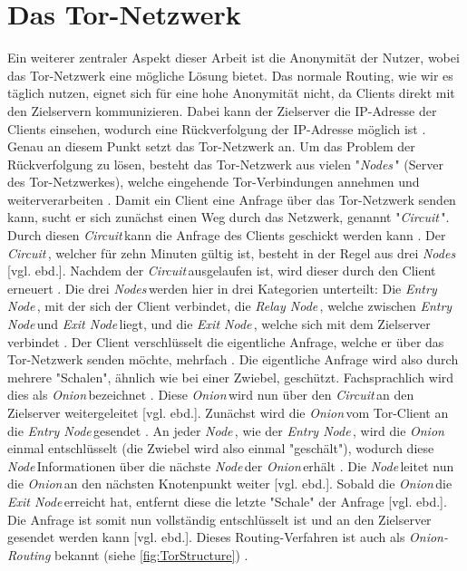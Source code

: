 \documentclass[a4paper,ngerman, headheight=28pt,12pt, footheight=27pt]{scrartcl}
\newcommand{\vcite}[1]{\cite[vgl.][]{#1}}
\newcommand{\vebd}{[vgl. ebd.]}
\newcommand{\entryn}{\textit{Entry Node\,}}
\newcommand{\relayn}{\textit{Relay Node\,}}
\newcommand{\exitn}{\textit{Exit Node\,}}
\newcommand{\nodes}{\textit{Nodes\,}}
\newcommand{\node}{\textit{Node\,}}
\newcommand{\onion}{\textit{Onion\,}}
\newcommand{\circuit}{\textit{Circuit\,}}
\begin{document}
\section{Das Tor-Netzwerk}
Ein weiterer zentraler Aspekt dieser Arbeit ist die Anonymität der Nutzer, wobei das Tor-Netzwerk eine mögliche Lösung bietet. Das normale Routing, wie wir es täglich nutzen, eignet sich für eine hohe Anonymität nicht, da Clients direkt mit den Zielservern kommunizieren. Dabei kann der Zielserver die IP-Adresse der Clients einsehen, wodurch eine Rückverfolgung der IP-Adresse möglich ist \vcite{TCP_IP,LocPolice}.
Genau an diesem Punkt setzt das Tor-Netzwerk an.
Um das Problem der Rückverfolgung zu lösen, besteht das Tor-Netzwerk aus vielen "\nodes" (Server des Tor-Netzwerkes), welche eingehende Tor-Verbindungen annehmen und weiterverarbeiten  \vcite{TorStructure}.
Damit ein Client eine Anfrage über das Tor-Netzwerk senden kann, sucht er sich zunächst einen Weg durch das Netzwerk, genannt "\circuit". Durch diesen \circuit kann die Anfrage des Clients geschickt werden kann \vcite{TorCircuits}.
Der \circuit, welcher für zehn Minuten gültig ist, besteht in der Regel aus drei \nodes \vebd. Nachdem der \circuit ausgelaufen ist, wird dieser durch den Client erneuert \vcite{FAQCircuitLifetime}.
Die drei \nodes werden hier in drei Kategorien unterteilt: Die \entryn, mit der sich der Client verbindet, die \relayn, welche zwischen \entryn und \exitn liegt, und die \exitn, welche sich mit dem Zielserver verbindet \vcite{TorStructure}. Der Client verschlüsselt die eigentliche Anfrage, welche er über das Tor-Netzwerk senden möchte, mehrfach \vcite{TorFirstPub}. Die eigentliche Anfrage wird also durch mehrere "Schalen", ähnlich wie bei einer Zwiebel, geschützt. Fachsprachlich wird dies als \onion bezeichnet \vcite{TorFirstPub}. Diese \onion wird nun über den \circuit an den Zielserver weitergeleitet \vebd.
Zunächst wird die \onion vom Tor-Client an die \entryn gesendet \vcite{TorStructure}. An jeder \node, wie der \entryn, wird die \onion einmal entschlüsselt (die Zwiebel wird also einmal "geschält"), wodurch diese \node Informationen über die nächste \node der \onion erhält \vcite{TorFirstPub}. Die \node leitet nun die \onion an den nächsten Knotenpunkt weiter \vebd. Sobald die \onion die \exitn erreicht hat, entfernt diese die letzte "Schale" der Anfrage \vebd. Die Anfrage ist somit nun vollständig entschlüsselt ist und an den Zielserver gesendet werden kann \vebd. Dieses Routing-Verfahren ist auch als \textit{Onion-Routing} bekannt (siehe \cref*{fig:TorStructure}) \vcite{TorStructure2}.
\end{document}
